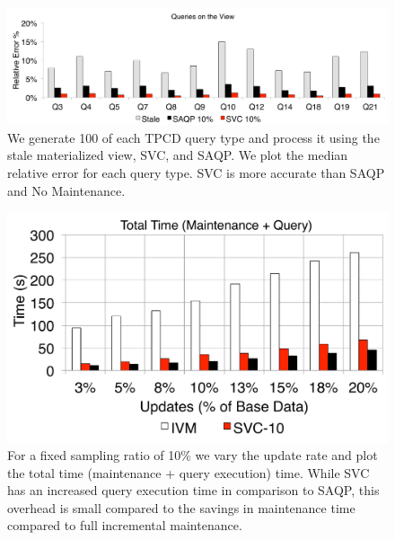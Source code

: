 \begin{figure}[t]
\centering
\includegraphics[scale=0.16]{exp/msj_3.pdf}
 \caption{We generate 100 of each TPCD query type and process it using the stale materialized view, SVC, and SAQP. We plot the median relative error for each query type. SVC is more accurate than SAQP and No Maintenance.\label{exp-1-acc}}
\end{figure}

\begin{figure}[t]
\centering
 \includegraphics[scale=0.16]{exp/msj_4.pdf}
  \caption{For a fixed sampling ratio of 10\% we vary the update rate and plot the total time (maintenance + query execution) time. While SVC has an increased query execution time in comparison to SAQP, this overhead is small compared to the savings in maintenance time compared to full incremental maintenance. \label{exp-1-total}}
\end{figure}

